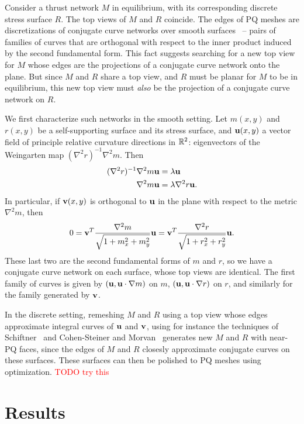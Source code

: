 \documentclass[annual]{acmsiggraph}
\newcommand{\todo}[1]{\textcolor{red}{#1}}
\begin{document}
Consider a thrust network $M$ in equilibrium, with its corresponding discrete stress surface $R$. The top views of $M$ and $R$ coincide. The edges of PQ meshes are discretizations of conjugate curve networks over smooth surfaces~\cite{Liu2006} -- pairs of families of curves that are orthogonal with respect to the inner product induced by the second fundamental form. This fact suggests searching for a new top view for $M$ whose edges are the projections of a conjugate curve network onto the plane. But since $M$ and $R$ share a top view, and $R$ must be planar for $M$ to be in equilibrium, this new top view must \emph{also} be the projection of a conjugate curve network on $R$.

We first characterize such networks in the smooth setting. Let $m(x,y)$ and $r(x,y)$ be a self-supporting surface and its stress surface, and ${\mathbf u}(x,y)$ a vector field of principle relative curvature directions in ${\mathbb R}^2$: eigenvectors of the Weingarten map $(\nabla^2 r)^{-1}\nabla^2 m$. Then
\begin{align*}
(\nabla^2 r)^{-1}\nabla^2 m {\mathbf u} &= \lambda {\mathbf u}\\
\nabla^2 m {\mathbf u} &= \lambda \nabla^2 r {\mathbf u}.
\end{align*}
In particular, if ${\mathbf v}(x,y)$ is orthogonal to ${\mathbf u}$ in the plane with respect to the metric $\nabla^2 m$, then
\begin{equation*}
0 = {\mathbf v}^T \frac{\nabla^2 m}{\sqrt{1+m_x^2+m_y^2}} {\mathbf u} = {\mathbf v}^T \frac{\nabla^2 r}{\sqrt{1+r_x^2+r_y^2}} {\mathbf u}.
\end{equation*}
These last two are the second fundamental forms of $m$ and $r$, so we have a conjugate curve network on each surface, whose top views are identical. The first family of curves is given by $({\mathbf u}, {\mathbf u}\cdot \nabla m)$ on $m$, $({\mathbf u}, {\mathbf u}\cdot \nabla r)$ on $r$, and similarly for the family generated by ${\mathbf v}$.

In the discrete setting, remeshing $M$ and $R$ using a top view whose edges approximate integral curves of ${\mathbf u}$ and ${\mathbf v}$, using for instance the techniques of Schiftner~ and Cohen-Steiner and Morvan~ generates new $M$ and $R$ with near-PQ faces, since the edges of $M$ and $R$ closesly approximate conjugate curves on these surfaces. These surfaces can then be polished to PQ meshes using optimization.
\todo{TODO try this}

\section{Results} \label{sec:results}
\end{document}
